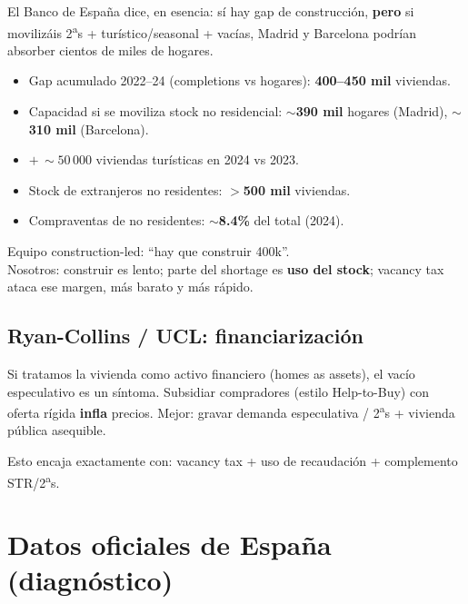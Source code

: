 \documentclass[11pt,a4paper]{report}
\begin{document}
\begin{intuicion}
El Banco de Espa\~na dice, en esencia: s\'i hay gap de construcci\'on,
\textbf{pero} si moviliz\'ais 2\textsuperscript{a}s + tur\'istico/seasonal + vac\'ias,
Madrid y Barcelona podr\'ian absorber cientos de miles de hogares.
\end{intuicion}

\begin{dato}
\begin{itemize}
  \item Gap acumulado 2022--24 (completions vs hogares): \textbf{400--450 mil} viviendas.
  \item Capacidad si se moviliza stock no residencial:
        $\sim$\textbf{390 mil} hogares (Madrid), $\sim$\textbf{310 mil} (Barcelona).
  \item $+\,\sim 50\,000$ viviendas tur\'isticas en 2024 vs 2023.
  \item Stock de extranjeros no residentes: $>$\textbf{500 mil} viviendas.
  \item Compraventas de no residentes: $\sim$\textbf{8.4\%} del total (2024).
\end{itemize}
\end{dato}

\begin{resumenbox}
Equipo construction-led: ``hay que construir 400k''.\\
Nosotros: construir es lento; parte del shortage es \textbf{uso del stock};
vacancy tax ataca ese margen, m\'as barato y m\'as r\'apido.
\end{resumenbox}

\section{Ryan-Collins / UCL: financiarizaci\'on}

\begin{intuicion}
Si tratamos la vivienda como activo financiero (homes as assets), el vac\'io
especulativo es un s\'intoma. Subsidiar compradores (estilo Help-to-Buy) con
oferta r\'igida \textbf{infla} precios. Mejor: gravar demanda especulativa / 2\textsuperscript{a}s
+ vivienda p\'ublica asequible.
\end{intuicion}

Esto encaja exactamente con: vacancy tax + uso de recaudaci\'on + complemento
STR/2\textsuperscript{a}s.

\chapter{Datos oficiales de Espa\~na (diagn\'ostico)}
\label{ch:datos}
\end{document}
